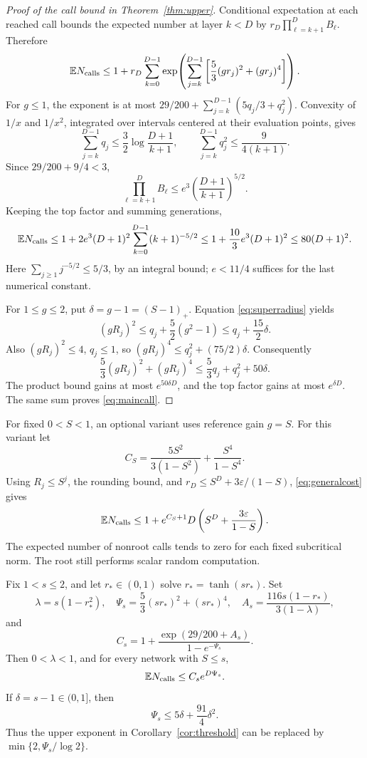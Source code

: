 \begin{proof}[Proof of the call bound in Theorem~\ref{thm:upper}]
Conditional expectation at each reached call bounds the expected
number at layer \(k<D\) by \(r_D\prod_{\ell=k+1}^DB_\ell\).
Therefore
\begin{equation}\label{eq:generalcost}
\mathbb E N_{\rm calls}\le1+r_D\sum_{k=0}^{D-1}
\exp\!\left(\sum_{j=k}^{D-1}
\left[\frac53(gr_j)^2+(gr_j)^4\right]\right).
\end{equation}
For \(g\le1\), the exponent is at most
\(29/200+\sum_{j=k}^{D-1}(5q_j/3+q_j^2)\).
Convexity of \(1/x\) and \(1/x^2\), integrated over intervals
centered at their evaluation points, gives
\begin{equation}\label{eq:qsums}
\sum_{j=k}^{D-1}q_j\le\frac32\log\frac{D+1}{k+1},
\qquad
\sum_{j=k}^{D-1}q_j^2\le\frac9{4(k+1)}.
\end{equation}
Since \(29/200+9/4<3\),
\[
\prod_{\ell=k+1}^DB_\ell
\le e^3\left(\frac{D+1}{k+1}\right)^{5/2}.
\]
Keeping the top factor and summing generations,
\[
\mathbb E N_{\rm calls}
\le1+2e^3(D+1)^2\sum_{k=0}^{D-1}(k+1)^{-5/2}
\le1+\frac{10}{3}e^3(D+1)^2
\le80(D+1)^2.
\]
Here \(\sum_{j\ge1}j^{-5/2}\le5/3\), by an integral bound;
\(e<11/4\) suffices for the last numerical constant.

For \(1\le g\le2\), put \(\delta=g-1=(S-1)_+\).
Equation \eqref{eq:superradius} yields
\[
(gR_j)^2\le q_j+\frac52(g^2-1)
\le q_j+\frac{15}{2}\delta.
\]
Also \((gR_j)^2\le4\), \(q_j\le1\), so
\((gR_j)^4\le q_j^2+(75/2)\delta\).
Consequently
\[
\frac53(gR_j)^2+(gR_j)^4
\le\frac53q_j+q_j^2+50\delta.
\]
The product bound gains at most \(e^{50\delta D}\), and the
top factor gains at most \(e^{\delta D}\).
The same sum proves \eqref{eq:maincall}.
\end{proof}

\begin{remark}
For fixed \(0<S<1\), an optional variant uses reference gain \(g=S\).
For this variant let
\[
C_S=\frac{5S^2}{3(1-S^2)}+\frac{S^4}{1-S^4}.
\]
Using \(R_j\le S^j\), the rounding bound, and
\(r_D\le S^D+3\varepsilon/(1-S)\), \eqref{eq:generalcost} gives
\[
\mathbb E N_{\rm calls}\le
1+e^{C_S+1}D\left(S^D+\frac{3\varepsilon}{1-S}\right).
\]
The expected number of nonroot calls tends to zero for each fixed
subcritical norm. The root still performs scalar random computation.
\end{remark}

\begin{proposition}\label{prop:fixedrate}
Fix \(1<s\le2\), and let \(r_*\in(0,1)\) solve
\(r_*=\tanh(sr_*)\).
Set
\[
\lambda=s(1-r_*^2),\quad
\Psi_s=\frac53(sr_*)^2+(sr_*)^4,\quad
A_s=\frac{116s(1-r_*)}{3(1-\lambda)},
\]
and
\[
C_s=1+\frac{\exp(29/200+A_s)}{1-e^{-\Psi_s}}.
\]
Then \(0<\lambda<1\), and for every network with \(S\le s\),
\[
\mathbb E N_{\rm calls}\le C_s e^{D\Psi_s}.
\]
If \(\delta=s-1\in(0,1]\), then
\begin{equation}\label{eq:psibound}
\Psi_s\le5\delta+\frac{91}{4}\delta^2.
\end{equation}
Thus the upper exponent in Corollary~\ref{cor:threshold} can be
replaced by \(\min\{2,\Psi_s/\log2\}\).
\end{proposition}
